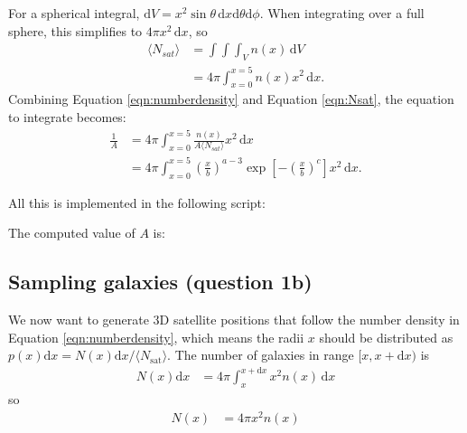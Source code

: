 For a spherical integral, $\mathrm{d}V = x^2 \sin{\theta} \,\mathrm{d}x \mathrm{d}\theta \mathrm{d}\phi$. When integrating over a full sphere, this simplifies to $4\pi x^2 \,\mathrm{d}x$, so
\begin{equation}\label{eqn:Nsat}
\begin{split}
\langle N_{sat} \rangle & = \int\int\int_V n(x) \,\mathrm{d}V \\
& = 4\pi \int_{x=0}^{x=5} n(x) x^2 \,\mathrm{d}x.
\end{split}
\end{equation}
Combining Equation \ref{eqn:numberdensity} and Equation \ref{eqn:Nsat}, the equation to integrate becomes:
\begin{equation}
\begin{split}
\frac1A 
& = 4\pi \int_{x=0}^{x=5}  \frac{n(x)}{A \langle N_{sat} \rangle} x^2 \,\mathrm{d}x \\
& = 4\pi \int_{x=0}^{x=5} 
\left( \frac{x}{b} \right)^{a-3}
\exp{\left[ -\left(\frac{x}{b}\right)^c \right]}
x^2 \,\mathrm{d}x.
\end{split}
\end{equation}

All this is implemented in the following script:


The computed value of $A$ is:


\subsection{Sampling galaxies (question 1b)}


We now want to generate 3D satellite positions that follow the number density in Equation \ref{eqn:numberdensity}, which means the radii $x$ should be distributed as
$p(x) \mathrm{d}x = N(x) \mathrm{d}x / \langle N_\mathrm{sat} \rangle$.
The number of galaxies in range $[x,x+\mathrm{d}x)$ is
\begin{equation}
\begin{split}
N(x) \mathrm{d}x & = 4\pi \int_{x}^{x+\mathrm{d}x} x^2 n(x) \,\mathrm{d}x
\end{split}
\end{equation}
so 
\begin{equation}
\begin{split}
N(x) & = 4\pi x^2 n(x)
\end{split}
\end{equation}

